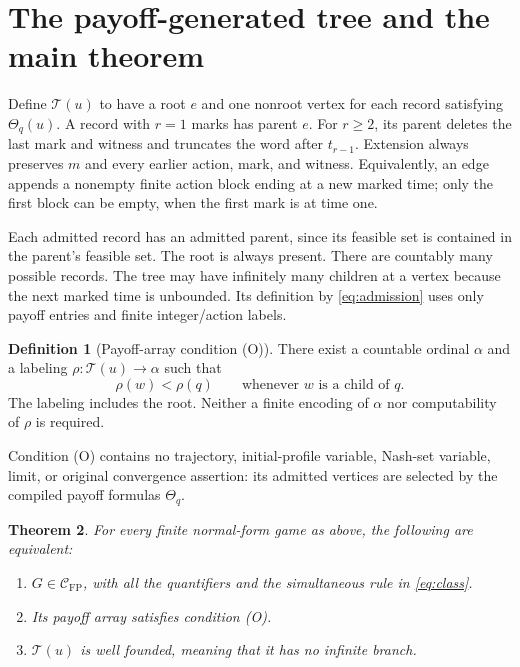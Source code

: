 \documentclass[11pt,a4paper]{article}
\newtheorem{theorem}{Theorem}
\theoremstyle{definition}
\newtheorem{definition}[theorem]{Definition}
\newcommand{\CFP}{\mathcal C_{\mathrm{FP}}}
\begin{document}
\section{The payoff-generated tree and the main theorem}

Define $\mathcal T(u)$ to have a root $e$ and one nonroot vertex for each
record satisfying $\Theta_q(u)$. A record with $r=1$ marks has parent $e$.
For $r\ge2$, its parent deletes the last mark and witness and truncates
the word after $t_{r-1}$. Extension always preserves $m$ and every earlier
action, mark, and witness. Equivalently, an edge appends a nonempty finite
action block ending at a new marked time; only the first block can be empty,
when the first mark is at time one.

Each admitted record has an admitted parent, since its feasible set is
contained in the parent's feasible set. The root is always present.
There are countably many possible records. The tree may have infinitely
many children at a vertex because the next marked time is unbounded.
Its definition by \eqref{eq:admission} uses only payoff entries and finite
integer/action labels.

\begin{definition}[Payoff-array condition (O)]\label{def:O}
There exist a countable ordinal $\alpha$ and a labeling
$\rho:\mathcal T(u)\to\alpha$ such that
\begin{equation}\tag{O}\label{eq:O}
 \rho(w)<\rho(q)\qquad\text{whenever $w$ is a child of $q$}.
\end{equation}
The labeling includes the root. Neither a finite encoding of $\alpha$
nor computability of $\rho$ is required.
\end{definition}

Condition (O) contains no trajectory, initial-profile variable, Nash-set
variable, limit, or original convergence assertion: its admitted vertices
are selected by the compiled payoff formulas $\Theta_q$.

\begin{theorem}\label{thm:main}
For every finite normal-form game as above, the following are equivalent:
\begin{enumerate}[label=\textup{(\roman*)}]
\item $G\in\CFP$, with all the quantifiers and the simultaneous rule in
\eqref{eq:class}.
\item Its payoff array satisfies condition \textup{(O)}.
\item $\mathcal T(u)$ is well founded, meaning that it has no infinite branch.
\end{enumerate}
\end{theorem}
\end{document}
